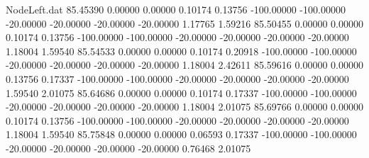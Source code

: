 \begin{filecontents}{NodeLeft.dat}
  85.45390    0.00000    0.00000     0.10174    0.13756 -100.00000 -100.00000  -20.00000  -20.00000  -20.00000  -20.00000    1.17765    1.59216
  85.50455    0.00000    0.00000     0.10174    0.13756 -100.00000 -100.00000  -20.00000  -20.00000  -20.00000  -20.00000    1.18004    1.59540
  85.54533    0.00000    0.00000     0.10174    0.20918 -100.00000 -100.00000  -20.00000  -20.00000  -20.00000  -20.00000    1.18004    2.42611
  85.59616    0.00000    0.00000     0.13756    0.17337 -100.00000 -100.00000  -20.00000  -20.00000  -20.00000  -20.00000    1.59540    2.01075
  85.64686    0.00000    0.00000     0.10174    0.17337 -100.00000 -100.00000  -20.00000  -20.00000  -20.00000  -20.00000    1.18004    2.01075
  85.69766    0.00000    0.00000     0.10174    0.13756 -100.00000 -100.00000  -20.00000  -20.00000  -20.00000  -20.00000    1.18004    1.59540
  85.75848    0.00000    0.00000     0.06593    0.17337 -100.00000 -100.00000  -20.00000  -20.00000  -20.00000  -20.00000    0.76468    2.01075
\end{filecontents}
